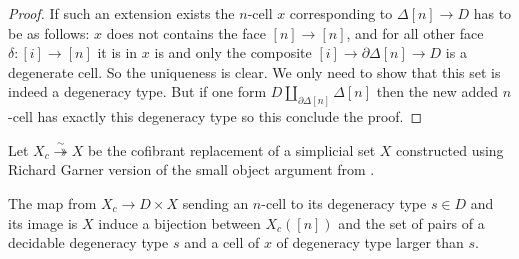 \documentclass[reqno,10pt,a4paper,oneside,draft]{amsart}
\begin{document}
\begin{proof}
If such an extension exists the $n$-cell $x$ corresponding to $\Delta[n] \rightarrow D$ has to be as follows: $x$ does not contains the face $[n] \rightarrow [n]$, and for all other face $\delta:[i] \rightarrow [n]$ it is in $x$ is and only the composite $[i] \rightarrow \partial \Delta[n] \rightarrow D$ is a degenerate cell. So the uniqueness is clear. We only need to show that this set is indeed a degeneracy type. But if one form $D \coprod_{\partial \Delta[n]} \Delta[n]$ then the new added $n$-cell has exactly this degeneracy type so this conclude the proof.
\end{proof}

Let $X_c \overset{\sim}{\twoheadrightarrow} X $ be the cofibrant replacement of a simplicial set $X$ constructed using Richard Garner version of the small object argument from \cite{garner:small-object-argument}.

\begin{proposition}
The map from $X_c \rightarrow D \times X$ sending an $n$-cell to its degeneracy type $s \in D$ and its image is $X$ induce a bijection between $X_c([n])$ and the set of pairs of a decidable degeneracy type $s$ and a cell of $x$ of degeneracy type larger than $s$.
\end{proposition}
\end{document}
